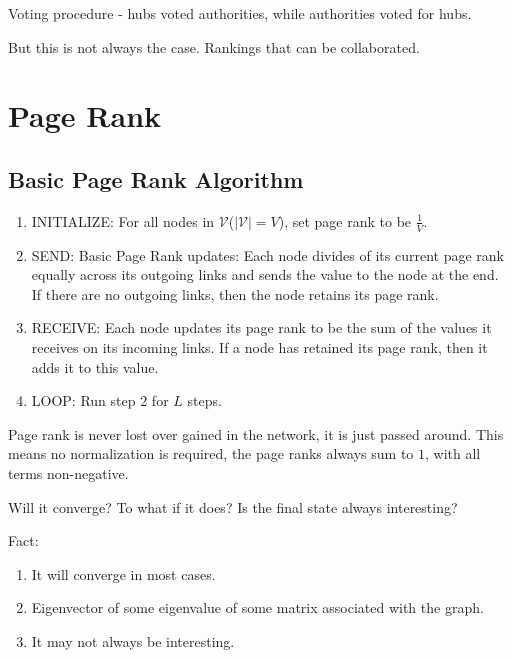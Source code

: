 \begin{prev}
	Voting procedure - hubs voted authorities, while authorities voted for hubs.
\end{prev}

But this is not always the case. Rankings that can be collaborated.

\section{Page Rank}
\subsection{Basic Page Rank Algorithm}
\begin{enumerate}
	\item INITIALIZE: For all nodes in \(\mathcal{V}\)(\(\left\vert \mathcal{V} \right\vert = V\)),
	      set page rank to be \(\frac{1}{V}\).
	\item SEND: Basic Page Rank updates: Each node divides of its current page rank equally across its outgoing
	      links and sends the value to the node at the end. If there are no outgoing links, then the node retains its page rank.
	\item RECEIVE: Each node updates its page rank to be the sum of the values it receives on its incoming links. If
	      a node has retained its page rank, then it adds it to this value.
	\item LOOP: Run step 2 for \(L\) steps.
\end{enumerate}
\begin{note}
	Page rank is never lost over gained in the network, it is just passed around. This means no normalization is required,
	the page ranks always sum to \(1\), with all terms non-negative.
\end{note}

\begin{problem}
Will it converge? To what if it does? Is the final state always interesting?
\end{problem}
\begin{answer}
	Fact: \begin{enumerate}
		\item It will converge in most cases.
		\item Eigenvector of some eigenvalue of some matrix associated with the graph.
		\item It may not always be interesting.
	\end{enumerate}
\end{answer}

